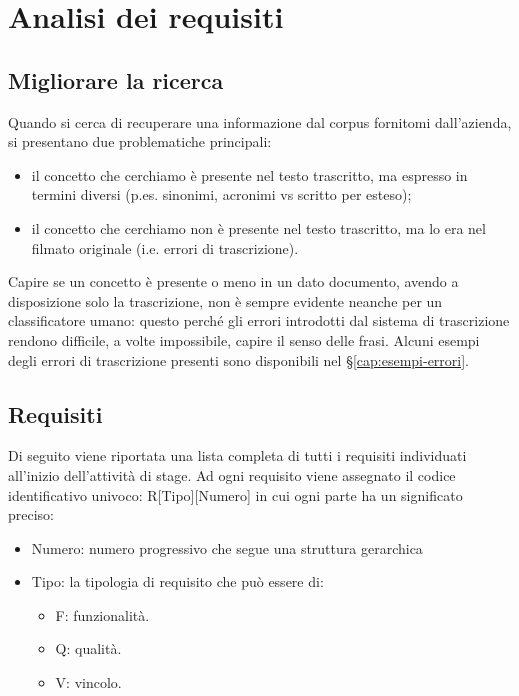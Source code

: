 
\chapter{Analisi dei requisiti}
\label{cap:analisi-requisiti}
\section{Migliorare la ricerca}
Quando si cerca di recuperare una informazione dal corpus fornitomi dall'azienda, si presentano due problematiche principali:
\begin{itemize}
    \item il concetto che cerchiamo è presente nel testo trascritto, ma espresso in termini diversi (p.es. sinonimi, acronimi vs scritto per esteso);
    \item il concetto che cerchiamo non è presente nel testo trascritto, ma lo era nel filmato originale (i.e. errori di trascrizione). 
\end{itemize}

Capire se un concetto è presente o meno in un dato documento, avendo a disposizione solo la trascrizione, non è sempre evidente neanche per un classificatore umano: questo perché gli errori introdotti dal sistema di trascrizione rendono difficile, a volte impossibile, capire il senso delle frasi. Alcuni esempi degli errori di trascrizione presenti sono disponibili nel §\ref{cap:esempi-errori}.

\section{Requisiti}
Di seguito viene riportata una lista completa di tutti i requisiti individuati all'inizio dell'attività di stage. Ad ogni requisito viene assegnato il codice identificativo univoco:
R[Tipo][Numero]
in cui ogni parte ha un significato preciso:
\begin{itemize}
    \item Numero: numero progressivo che segue una struttura gerarchica
    \item Tipo: la tipologia di requisito che può essere di:
    \begin{itemize}
        \item F: funzionalità.
        \item Q: qualità.
        \item V: vincolo.
    \end{itemize} 
\end{itemize}

